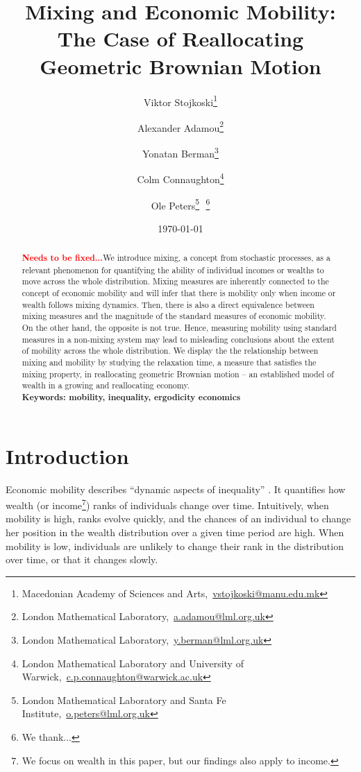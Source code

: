\documentclass[11pt]{article}
\newcommand{\bc}{\begin{center}}
\newcommand{\ec}{\end{center}}
\newcommand{\red}[1]{{\color{red} #1}}
\numberwithin{equation}{section}
\begin{document}
\begin{titlepage}
\title{Mixing and Economic Mobility: The Case of Reallocating Geometric Brownian Motion}
\author{Viktor Stojkoski\footnote{Macedonian Academy of Sciences and Arts,~\url{vstojkoski@manu.edu.mk}} \and Alexander Adamou\footnote{London Mathematical Laboratory,~\url{a.adamou@lml.org.uk}} \and Yonatan Berman\footnote{London Mathematical Laboratory,~\url{y.berman@lml.org.uk}} \and Colm Connaughton\footnote{London Mathematical Laboratory and University of Warwick,~\url{c.p.connaughton@warwick.ac.uk}} \and Ole Peters\footnote{London Mathematical Laboratory and Santa Fe Institute,~\url{o.peters@lml.org.uk}}\,\, \thanks{We thank...}}
\date{\today}
\maketitle
\begin{abstract}
\textcolor{red}{\textbf{Needs to be fixed...}}We introduce mixing, a concept from stochastic processes, as a relevant phenomenon for quantifying the ability of individual incomes or wealths to move across the whole distribution. Mixing measures are inherently connected to the concept of economic mobility and will  infer that there is mobility only when income or wealth follows mixing dynamics. Then, there is also a direct equivalence between mixing measures and the magnitude of the standard measures of economic mobility. On the other hand, the opposite is not true. Hence, measuring mobility using standard measures in a non-mixing system may lead to misleading conclusions about the extent of mobility across the whole distribution. We display the the relationship between mixing and mobility by studying the relaxation time, a measure that satisfies the mixing property, in reallocating geometric Brownian motion -- an established model of wealth in a growing and reallocating economy.
\\

\noindent\textbf{Keywords: mobility, inequality, ergodicity economics}
\end{abstract}
\setcounter{page}{0}
\thispagestyle{empty}
\end{titlepage}
\pagebreak \newpage
\section{Introduction}\label{sec:introduction}
Economic mobility describes ``dynamic aspects of inequality'' \citep{Shorrocks1978}. It quantifies how wealth (or income\footnote{We focus on wealth in this paper, but our findings also apply to income.}) ranks of individuals change over time. Intuitively, when mobility is high, ranks evolve quickly, and the chances of an individual to change her position in the wealth distribution over a given time period are high. When mobility is low, individuals are unlikely to change their rank in the distribution over time, or that it changes slowly.
\end{document}
